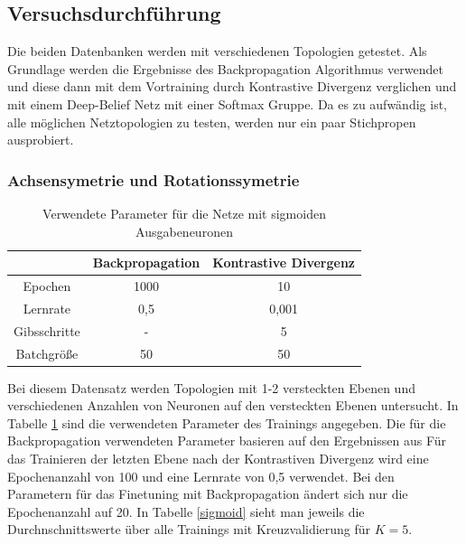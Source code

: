 \documentclass[12pt]{article}
\begin{document}
\subsection{Versuchsdurchführung}
Die beiden Datenbanken werden mit verschiedenen Topologien getestet. Als Grundlage werden die Ergebnisse des Backpropagation Algorithmus verwendet und diese dann mit dem Vortraining durch Kontrastive Divergenz verglichen und mit einem Deep-Belief Netz mit einer Softmax Gruppe. Da es zu aufwändig ist, alle möglichen Netztopologien zu testen, werden nur ein paar Stichpropen ausprobiert.

\subsubsection{Achsensymetrie und Rotationssymetrie}
\begin{table}[H]
\center
\begin{tabular}{|c|c|c|}
&Backpropagation & Kontrastive Divergenz\\\hline
Epochen&1000&10\\\hline
Lernrate&0,5&0,001\\\hline
Gibsschritte& - &5\\\hline
Batchgröße& 50 &50\\\hline
\end{tabular}
\caption{Verwendete Parameter für die Netze mit sigmoiden Ausgabeneuronen}
\label{params}
\end{table}
Bei diesem Datensatz werden Topologien mit 1-2 versteckten Ebenen und verschiedenen Anzahlen von Neuronen auf den versteckten Ebenen untersucht. In Tabelle \ref{params} sind die verwendeten Parameter des Trainings angegeben. Die für die Backpropagation verwendeten Parameter basieren auf den Ergebnissen aus \cite{Helm} Für das Trainieren der letzten Ebene nach der Kontrastiven Divergenz wird eine Epochenanzahl von 100 und eine Lernrate von 0,5 verwendet. Bei den Parametern für das Finetuning mit Backpropagation ändert sich nur die Epochenanzahl auf 20.  In Tabelle \ref{sigmoid} sieht man jeweils die Durchnschnittswerte über alle Trainings mit Kreuzvalidierung für $K=5$. 
\end{document}

